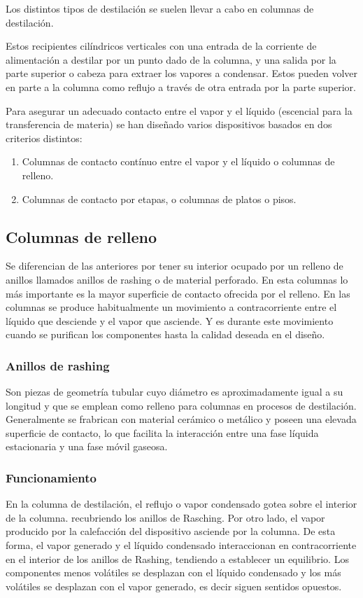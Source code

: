 \documentclass[11pt,openany]{book}
\begin{document}
Los distintos tipos de destilación se suelen llevar a cabo en columnas de destilación.

Estos recipientes cilíndricos verticales con una entrada de la corriente de alimentación a 
destilar por un punto dado de la columna, y una salida por la parte superior o cabeza para extraer 
los vapores a condensar. Estos pueden volver en parte a la columna como reflujo a través de otra entrada por la 
parte superior.

Para asegurar un adecuado contacto entre el vapor y el líquido (escencial para la transferencia de materia) se han 
diseñado varios dispositivos basados en dos criterios distintos:
\begin{enumerate}
\item Columnas de contacto contínuo entre el vapor y el líquido o columnas de relleno.
\item Columnas de contacto por etapas, o columnas de platos o pisos.
\end{enumerate}
\subsection{Columnas de relleno}
Se diferencian de las anteriores por tener su interior ocupado por un relleno de anillos
llamados anillos de rashing o de material perforado.
En esta columnas lo más importante es la mayor superficie de contacto ofrecida por el relleno.
En las columnas se produce habitualmente un movimiento a contracorriente entre el líquido que 
desciende y el vapor que asciende. Y es durante este movimiento cuando se purifican los 
componentes hasta la calidad deseada en el diseño.
\subsubsection{Anillos de rashing}
Son piezas de geometría tubular cuyo diámetro es aproximadamente igual a su longitud y que se 
emplean como relleno para columnas en procesos de destilación.
Generalmente se frabrican con material cerámico o metálico y poseen una elevada superficie de 
contacto, lo que facilita la interacción entre una fase líquida estacionaria y una fase móvil gaseosa.
\subsubsection{Funcionamiento}
En la columna de destilación, el reflujo o vapor condensado gotea sobre el interior de la columna.
recubriendo los anillos de Rasching.
Por otro lado, el vapor producido por la calefacción del dispositivo asciende por la columna.
De esta forma, el vapor generado y el líquido condensado interaccionan en contracorriente en el 
interior de los anillos de Rashing, tendiendo a establecer un equilibrio. Los componentes menos 
volátiles se desplazan con el líquido condensado y los más volátiles se desplazan con el vapor generado, 
es decir siguen sentidos opuestos.
\end{document}
